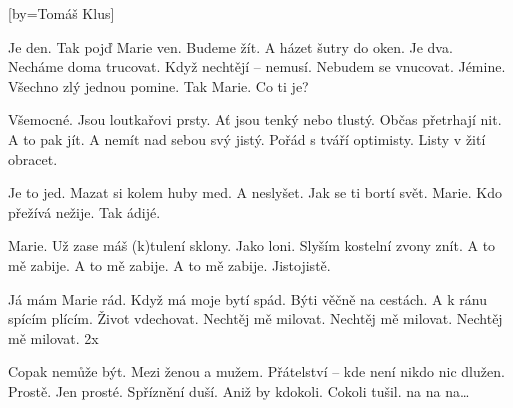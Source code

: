 [by={Tomáš Klus}]

\beginverse{}
Je den. Tak pojď Marie ven.
Budeme žít. A házet šutry do oken.
Je dva. Necháme doma trucovat.
Když nechtějí -- nemusí. Nebudem se vnucovat.
Jémine. Všechno zlý jednou pomine.
Tak Marie. Co ti je?
\endverse{}

\beginverse{}
Všemocné. Jsou loutkařovi prsty.
Ať jsou tenký nebo tlustý. Občas přetrhají nit.
A to pak jít. A nemít nad sebou svý jistý.
Pořád s tváří optimisty. Listy v žití obracet.
\endverse{}

\beginverse{}
Je to jed. Mazat si kolem huby med.
A neslyšet. Jak se ti bortí svět.
Marie. Kdo přežívá nežije. Tak ádijé.
\endverse{}

\beginverse{}
Marie. Už zase máš (k)tulení sklony.
Jako loni. Slyším kostelní zvony znít.
A to mě zabije. A to mě zabije.
A to mě zabije. Jistojistě.
\endverse{}

\beginchorus{}
Já mám Marie rád. Když má moje bytí spád.
Býti věčně na cestách. A k ránu spícím plícím.
Život vdechovat. Nechtěj mě milovat.
Nechtěj mě milovat. Nechtěj mě milovat. 2x
\endchorus{}

\beginverse{}
Copak nemůže být. Mezi ženou a mužem.
Přátelství -- kde není nikdo nic dlužen. Prostě.
Jen prosté. Spříznění duší.
Aniž by kdokoli. Cokoli tušil.
na na na\ldots{}
\endverse{}

\beginchorus{}
\phantom{}
\endchorus{}

\endsong{}
